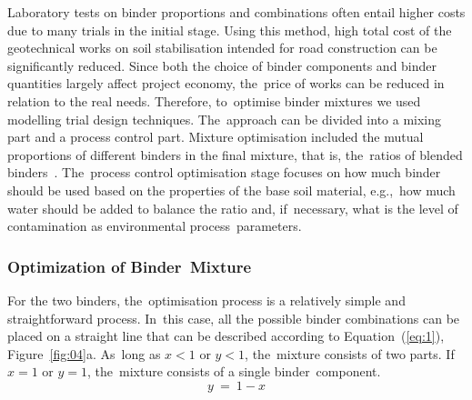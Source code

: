 \documentclass[materials,article,accept,pdftex,moreauthors]{Definitions/mdpi}
\begin{document}
Laboratory tests on binder proportions and combinations often entail higher costs due to many trials in the initial stage. Using this method, high total cost of the geotechnical works on soil stabilisation intended for road construction can be significantly reduced. Since both the choice of binder components and binder quantities largely affect project economy, the~price of works can be reduced in relation to the real needs. Therefore, to~optimise binder mixtures we used modelling trial design techniques. The~approach can be divided into a mixing part and a process control part. Mixture optimisation included the mutual proportions of different binders in the final mixture, that is, the~ratios of blended binders~\cite{Lindh2001}. The~process control optimisation stage focuses on how much binder should be used based on the properties of the base soil material, e.g.,~how much water should be added to balance the ratio and, if~necessary, what is the level of contamination as environmental process~parameters.

\subsubsection{Optimization of Binder~Mixture}
For the two binders, the~optimisation process is a relatively simple and straightforward process. In~this case, all the possible binder combinations can be placed on a straight line that can be described according to Equation~(\ref{eq:1}), Figure~\ref{fig:04}a. As~long as $x < 1$ or $y < 1$, the~mixture consists of two parts. If~$x=1$ or $y=1$, the~mixture consists of a single \mbox{binder component. }
\begin{equation}\label{eq:1}
y~=~1 - x
\end{equation}
\end{document}
